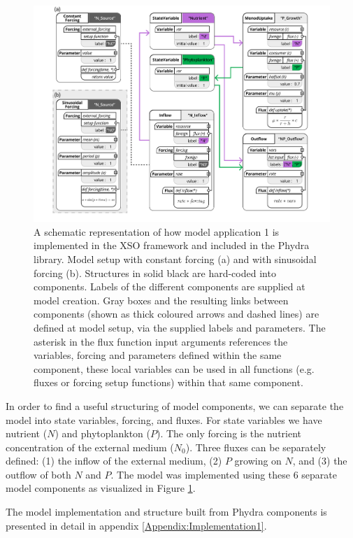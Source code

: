 \documentclass[journal abbreviation, manuscript]{copernicus}
\begin{document}
\begin{figure}[t]
\includegraphics[width=15cm]{Figures/firstdraft_schematics/code_schematics/Chemostat.pdf}
\caption{A schematic representation of how model application 1 is implemented in the XSO framework and included in the Phydra library. Model setup with constant forcing (a) and with sinusoidal forcing (b). Structures in solid black are hard-coded into components. Labels of the different components are supplied at model creation. Gray boxes and the resulting links between components (shown as thick coloured arrows and dashed lines) are defined at model setup, via the supplied labels and parameters. The asterisk in the flux function input arguments references the variables, forcing and parameters defined within the same component, these local variables can be used in all functions (e.g. fluxes or forcing setup functions) within that same component.}
\label{Figure:CodeSchematics_1}
\end{figure}

In order to find a useful structuring of model components, we can separate the model into state variables, forcing, and fluxes. For state variables we have nutrient ($N$) and phytoplankton ($P$). The only forcing is the nutrient concentration of the external medium ($N_0$). Three fluxes can be separately defined: (1) the inflow of the external medium, (2) $P$ growing on $N$, and (3) the outflow of both $N$ and $P$.
The model was implemented using these 6 separate model components as visualized in Figure \ref{Figure:CodeSchematics_1}.

The model implementation and structure built from Phydra components is presented in detail in appendix \ref{Appendix:Implementation1}.
\end{document}
